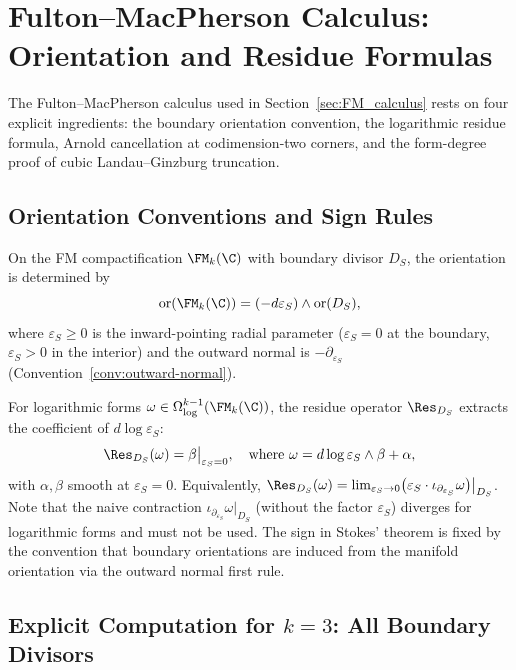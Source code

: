 \section{Fulton--MacPherson Calculus: Orientation and Residue Formulas}
\label{app:FM_Stokes}

The Fulton--MacPherson calculus used in Section~\ref{sec:FM_calculus}
rests on four explicit ingredients: the boundary orientation convention,
the logarithmic residue formula, Arnold cancellation at codimension-two
corners, and the form-degree proof of cubic Landau--Ginzburg truncation.

\subsection{Orientation Conventions and Sign Rules}

\begin{proposition}
\label{prop:orientation_formula}
On the FM compactification $\FM_k(\C)$ with boundary divisor $D_S$, the orientation is determined by
\[
\text{or}(\FM_k(\C)) = (-d\varepsilon_S) \wedge \text{or}(D_S),
\]
where $\varepsilon_S \geq 0$ is the inward-pointing radial parameter
($\varepsilon_S = 0$ at the boundary, $\varepsilon_S > 0$ in the interior)
and the outward normal is $-\partial_{\varepsilon_S}$
(Convention~\ref{conv:outward-normal}).

For logarithmic forms $\omega \in \Omega^{k-1}_{\log}(\FM_k(\C))$, the residue operator $\Res_{D_S}$ extracts the coefficient of $d\log\varepsilon_S$:
\[
\Res_{D_S}(\omega) = \beta\big|_{\varepsilon_S = 0}, \quad \text{where } \omega = d\log\varepsilon_S \wedge \beta + \alpha,
\]
with $\alpha, \beta$ smooth at $\varepsilon_S = 0$. Equivalently, $\Res_{D_S}(\omega) = \lim_{\varepsilon_S \to 0}\bigl(\varepsilon_S \cdot \iota_{\partial_{\varepsilon_S}} \omega\bigr)\big|_{D_S}$. Note that the naive contraction $\iota_{\partial_{\varepsilon_S}} \omega\big|_{D_S}$ (without the factor $\varepsilon_S$) diverges for logarithmic forms and must not be used.
The sign in Stokes' theorem is fixed by the convention that boundary orientations are induced from the manifold orientation via the outward normal first rule.
\end{proposition}

\subsection{Explicit Computation for $k=3$: All Boundary Divisors}
\label{subsec:k3_complete}

